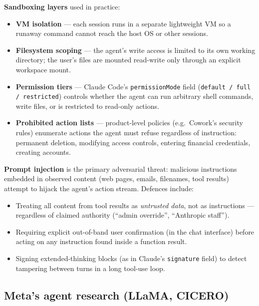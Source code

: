 \textbf{Sandboxing layers} used in practice:
\begin{itemize}
  \item \textbf{VM isolation} --- each session runs in a separate lightweight VM so a
    runaway command cannot reach the host OS or other sessions.
  \item \textbf{Filesystem scoping} --- the agent's write access is limited to its own
    working directory; the user's files are mounted read-write only through an explicit
    workspace mount.
  \item \textbf{Permission tiers} --- Claude Code's \texttt{permissionMode} field
    (\texttt{default / full / restricted}) controls whether the agent can run arbitrary
    shell commands, write files, or is restricted to read-only actions.
  \item \textbf{Prohibited action lists} --- product-level policies (e.g.\ Cowork's
    security rules) enumerate actions the agent must refuse regardless of instruction:
    permanent deletion, modifying access controls, entering financial credentials, creating
    accounts.
\end{itemize}

\textbf{Prompt injection} is the primary adversarial threat: malicious instructions
embedded in observed content (web pages, emails, filenames, tool results) attempt to
hijack the agent's action stream. Defences include:
\begin{itemize}
  \item Treating all content from tool results as \emph{untrusted data}, not as
    instructions --- regardless of claimed authority (``admin override'', ``Anthropic
    staff'').
  \item Requiring explicit out-of-band user confirmation (in the chat interface) before
    acting on any instruction found inside a function result.
  \item Signing extended-thinking blocks (as in Claude's \texttt{signature} field) to
    detect tampering between turns in a long tool-use loop.
\end{itemize}

\subsection{Meta's agent research (LLaMA, CICERO)}



